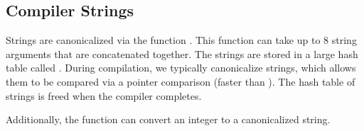 \documentclass[10pt]{article}
\begin{document}
\subsection{Compiler Strings}
\label{sec:strings}

Strings are canonicalized via the function .  This function
can take up to 8 string arguments that are concatenated together.  The
strings are stored in a large hash table called
.  During compilation, we typically
canonicalize strings, which allows them to be compared via a pointer
comparison (faster than ).  The hash table of strings is freed when the compiler
completes.

Additionally, the function  can convert an integer to a
canonicalized string.
\end{document}
